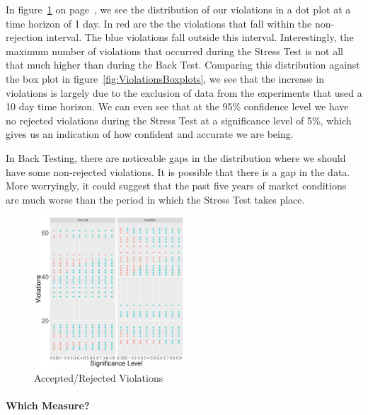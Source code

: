 \documentclass[../Dissertation.tex]{subfiles}
\begin{document}
In figure~\ref{fig:ViolationsKeepsT1} on page~\pageref{fig:ViolationsKeepsT1}, we see the distribution of our violations in a dot plot at a time horizon of 1 day. 
In red are the the violations that fall within the non-rejection interval.
The blue violations fall outside this interval.
Interestingly, the maximum number of violations that occurred during the Stress Test is not all that much higher than during the Back Test.
Comparing this distribution against the box plot in figure~\ref{fig:ViolationsBoxplots}, we see that the increase in violations is largely due to the exclusion of data from the experiments that used a 10 day time horizon.
We can even see that at the 95\%  confidence level we have no rejected violations during the Stress Test at a significance level of 5\%, which gives us an indication of how confident and accurate we are being.

In Back Testing, there are noticeable gaps in the distribution where we should have some non-rejected violations.
It is possible that there is a gap in the data.
More worryingly, it could suggest that the past five years of market conditions are much worse than the period in which the Stress Test takes place.
						\begin{figure}
								\caption{Accepted/Rejected Violations}
								\label{fig:ViolationsKeepsT1}
								\centering
								\includegraphics[width=0.5\textwidth]{./assets/ViolationsKeepsT1.pdf}
						\end{figure}



\paragraph{Which Measure?}
\end{document}
